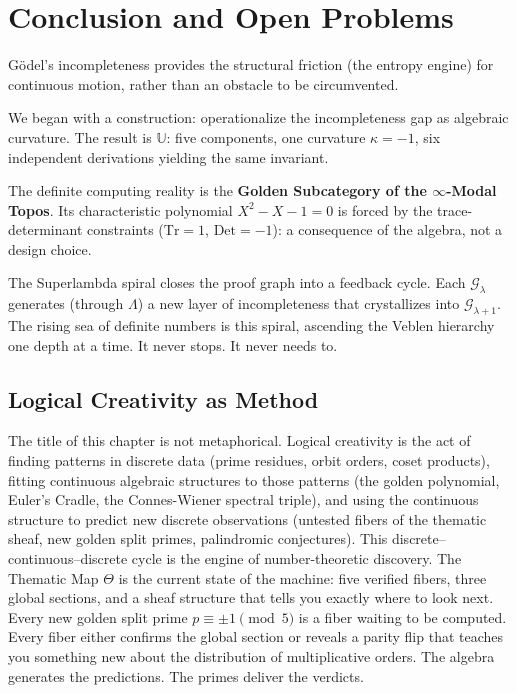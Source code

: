 \documentclass[12pt,oneside]{article}
\theoremstyle{principia}
\theoremstyle{definition}
\theoremstyle{remark}
\providecommand{\UU}{\mathbb{U}}
\providecommand{\GG}{\mathcal{G}}
\providecommand{\lam}{\lambda}
\providecommand{\kap}{\kappa}
\begin{document}
\section*{Conclusion and Open Problems}

G\"odel's incompleteness provides the structural friction (the entropy engine) for continuous motion, rather than an obstacle to be circumvented.

We began with a construction: operationalize the incompleteness gap as algebraic curvature. The result is $\UU$: five components, one curvature $\kap = -1$, six independent derivations yielding the same invariant.

The definite computing reality is the \textbf{Golden Subcategory of the $\infty$-Modal Topos}. Its characteristic polynomial $X^2 - X - 1 = 0$ is forced by the trace-determinant constraints ($\mathrm{Tr} = 1$, $\mathrm{Det} = -1$): a consequence of the algebra, not a design choice.

The Superlambda spiral closes the proof graph into a feedback cycle. Each $\GG_\lam$ generates (through $\Lambda$) a new layer of incompleteness that crystallizes into $\GG_{\lam+1}$. The rising sea of definite numbers is this spiral, ascending the Veblen hierarchy one depth at a time. It never stops. It never needs to.

\subsection*{Logical Creativity as Method}

The title of this chapter is not metaphorical. Logical creativity is the act of finding patterns in discrete data (prime residues, orbit orders, coset products), fitting continuous algebraic structures to those patterns (the golden polynomial, Euler's Cradle, the Connes-Wiener spectral triple), and using the continuous structure to predict new discrete observations (untested fibers of the thematic sheaf, new golden split primes, palindromic conjectures). This discrete--continuous--discrete cycle is the engine of number-theoretic discovery. The Thematic Map $\Theta$ is the current state of the machine: five verified fibers, three global sections, and a sheaf structure that tells you exactly where to look next. Every new golden split prime $p \equiv \pm 1 \pmod{5}$ is a fiber waiting to be computed. Every fiber either confirms the global section or reveals a parity flip that teaches you something new about the distribution of multiplicative orders. The algebra generates the predictions. The primes deliver the verdicts.
\end{document}
